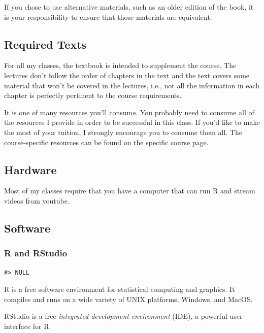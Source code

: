 \documentclass[
]{book}
\begin{document}
If you chose to use alternative materials, such as an older edition of the book, it is your responsibility to ensure that those materials are equivalent.

\hypertarget{required-texts}{%
\subsection{Required Texts}\label{required-texts}}

For all my classes, the textbook is intended to supplement the course.
The lectures don't follow the order of chapters in the text and the text covers some material that won't be covered in the lectures, i.e., not all the information in each chapter is perfectly pertinent to the course requirements.

It is one of many resources you'll consume.
You probably need to consume all of the resources I provide in order to be successful in this class.
If you'd like to make the most of your tuition, I strongly encourage you to consume them all.
The course-specific resources can be found on the specific course page.

\hypertarget{hardware}{%
\subsection{Hardware}\label{hardware}}

Most of my classes require that you have a computer that can run R and stream videos from youtube.

\hypertarget{software}{%
\subsection{Software}\label{software}}

\hypertarget{r-and-rstudio}{%
\subsubsection{R and RStudio}\label{r-and-rstudio}}

\begin{verbatim}
#> NULL
\end{verbatim}

R is a free software environment for statistical computing and graphics. It compiles and runs on a wide variety of UNIX platforms, Windows, and MacOS.

RStudio is a free \emph{integrated development environment} (IDE), a powerful user interface for R.
\end{document}

